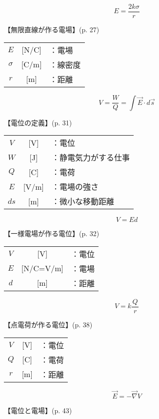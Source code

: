 \documentclass[10pt]{jarticle}
\begin{document}
\newpage
\[
E = \frac{2k \sigma}{r}
\]

\vskip3mm
\noindent
【無限直線が作る電場】{\footnotesize (p. 27)}

\begin{tabular}{ccl}
$E$	&[N/C]	&：電場 \\
$\sigma$	&[C/m]	&：線密度\\
$r$	&[m]	&：距離
\end{tabular}




\newpage
\[
V = \frac{W}{Q} = \int \vec{E} \cdot d\vec{s}
\]


\vskip3mm
\noindent
【電位の定義】{\footnotesize (p. 31)}

\begin{tabular}{ccl}
$V$	&[V]	&：電位 \\
$W$	&[J]	&：{\small 静電気力がする仕事} \\
$Q$	&[C]	&：電荷\\
$E$	&[V/m]	&：電場の強さ\\
$ds$	&[m]	&：微小な移動距離\\
\end{tabular}




\newpage
\[
V = E d
\]


\vskip3mm
\noindent
【一様電場が作る電位】{\footnotesize (p. 32)}

\begin{tabular}{ccl}
$V$	&[V]	&：電位 \\
$E$	&[N/C=V/m]	&：電場 \\
$d$	&[m]	&：距離
\end{tabular}





\newpage
\[
V = k \frac{Q}{\; r \;}
\]


\vskip3mm
\noindent
【点電荷が作る電位】{\footnotesize (p. 38)}

\begin{tabular}{ccl}
$V$	&[V]	&：電位 \\
$Q$	&[C]	&：電荷 \\
$r$	&[m]	&：距離
\end{tabular}



\newpage
\[
\vec{E} = - \vec{\nabla} V
\]


\vskip3mm
\noindent
【電位と電場】{\footnotesize (p. 43)}
\end{document}
